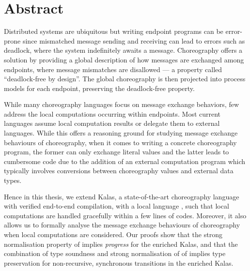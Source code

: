 \chapter*{Abstract}
Distributed systems are ubiquitous but writing endpoint programs can be 
error-prone since mismatched message sending and receiving can lead to 
errors such as deadlock, where the system indefinitely awaits a message.
Choreography offers a solution by providing a global description of how 
messages are exchanged among endpoints, where message mismatches are disallowed ---
a property called ``deadlock-free by design''. The global choreography 
is then projected into process models for each endpoint,
preserving the deadlock-free property.

While many choreography languages focus on message exchange behaviors, few address 
the local computations occurring within endpoints. Most current languages assume local 
computation results or delegate them to external languages. While this offers a reasoning 
ground for studying message exchange behaviours of choreography, when it comes to writing 
a concrete choreography program, the former can only exchange literal values and the 
latter leads to cumbersome code due to the addition of an external computation program which 
typically involves conversions between choreography values and external data types.

Hence in this thesis, we extend Kalas, a state-of-the-art choreography language with
verified end-to-end compilation, with a local language \richerlang{}, such that
local computations are handled gracefully within a few lines of codes. Moreover,
it also allows us to formally analyse the message exchange behaviours of choreography 
when local computations are considered. Our proofs show that the strong normalisation
property of \richerlang{} implies \emph{progress} for the enriched Kalas, and that
the combination of type soundness and strong normalisation of of \richerlang{} implies
type preservation for non-recursive, synchronous transitions in the enriched Kalas.






